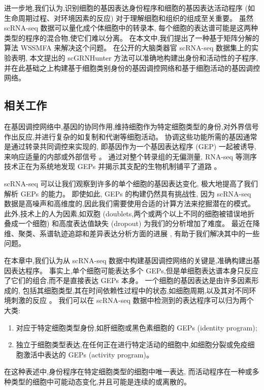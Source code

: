 进一步地,我们认为,识别细胞的基因表达身份程序和细胞的基因表达活动程序 (如生命周期过程、对环境因素的反应) 
对于理解细胞和组织的组成至关重要。
虽然 scRNA-seq 数据可以量化成个体细胞中的转录本,
每个细胞的表达谱可能是这两种类型的程序的混合物,使它们难以分离。
在本文中,我们提出了一种基于矩阵分解的算法 WSSMFA 来解决这个问题。
在公开的大脑类器官 scRNA-seq 数据集上的实验表明,
本文提出的 scGRNHunter 方法可以准确地构建出身份和活动性的子程序, 
并在此基础之上构建基于细胞类别身份的基因调控网络和基于细胞活动的基因调控网络。

\subsection{相关工作}
在基因调控网络中,基因的协同作用,维持细胞作为特定细胞类型的身份,对外界信号作出反应,并进行复杂的如复制和代谢等细胞活动。
协调这些功能所需的基因通常是通过转录共同调控来实现的,
即基因作为一个基因表达程序 (GEP) 一起被诱导,
来响应适量的内部或外部信号 \cite{eisen1998cluster,segal2003module}。
通过对整个转录组的无偏测量, RNA-seq 等测序技术正在为系统地发现 GEPs 并揭示其支配的生物机制铺平了道路 \cite{liberzon2015molecular}。

scRNA-seq 可以让我们观察到许多的单个细胞的基因表达变化,
极大地提高了我们解析 GEPs 的能力。
即使如此, GEPs 的构建仍然具有挑战性,
因为 scRNA-seq 数据是高噪声和高维度的,因此我们需要使用合适的计算方法来挖掘潜在的模式。
此外,技术上的人为因素,如双胞 (doublets,两个或两个以上不同的细胞被错误地折叠成一个细胞) 和高度表达值缺失 (dropout) 为我们的分析增加了难度。
最近在降维、聚类、系谱轨迹追踪和差异表达分析方面的进展 \cite{amir2013visne,kharchenko2014bayesian,satija2015spatial,trapnell2014dynamics},
有助于我们解决其中的一些问题。

在本章中,我们认为从 scRNA-seq 数据中构建基因调控网络的关键是,准确构建出基因表达程序。
事实上,单个细胞可能表达多个 GEPs,但是单细胞表达谱本身只反应了它们的组合,而不是直接表达 GEPs 本身。
一个细胞的基因表达是由许多因素形成的,
包括其细胞类型,其在时间依赖性过程中的状态,如细胞周期,以及其对不同环境刺激的反应 \cite{wagner2016revealing}。
我们可以在 scRNA-seq 数据中检测到的表达程序可以归为两个大类:
\begin{enumerate}[label=(\arabic*),itemindent=2em]
    \item 对应于特定细胞类型身份,如肝细胞或黑色素细胞的 GEPs (identity program);
    \item 独立于细胞类型表达,在任何正在进行特定活动的细胞中,如细胞分裂或免疫细胞激活中表达的 GEPs (activity program)。
\end{enumerate}
在这种表述中,身份程序在特定细胞类型的细胞中唯一表达,
而活动程序在一种或多种类型的细胞中可能动态变化,并且可能是连续的或离散的。

